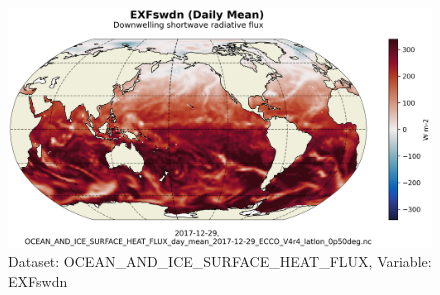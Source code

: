 \begin{figure}[H]
\centering
\includegraphics[scale=0.55]{../images/plots/latlon_plots/Ocean_and_Sea-Ice_Surface_Heat_Fluxes/EXFswdn.png}
\caption{Dataset: OCEAN\_AND\_ICE\_SURFACE\_HEAT\_FLUX, Variable: EXFswdn}
\label{tab:table-OCEAN_AND_ICE_SURFACE_HEAT_FLUX_EXFswdn-Plot}
\end{figure}
\pagebreak
